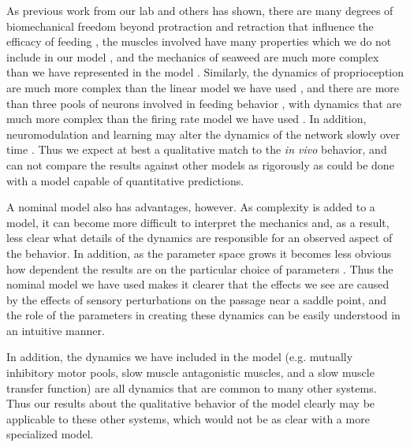 As
previous work from our lab and others has shown, there are many degrees of
biomechanical freedom beyond protraction and retraction that influence the
efficacy of feeding
\citep{sutton_passive_2004,sutton_neural_2004,novakovic_mechanical_2006}, the
muscles involved have
many properties which we do not include in our model
\citep{yu_biomechanical_1999,zajac_muscle_1989},
and the mechanics of seaweed are much more complex than we have represented in
the model \citep{denny_mechanics_2002,harder_comparison_2006}.  Similarly,
the dynamics of proprioception are much more complex than the linear model
we have used \citep{evans_proprioceptive_1998}, and there are more than three
pools of neurons involved in feeding behavior
\citep{hurwitz_different_1997}, with dynamics that are much more complex than
the firing rate model we have used \citep{susswein_mechanisms_2002}.
In addition, neuromodulation and learning may alter the dynamics of the network slowly over time \citep{nargeot_functional_2012,susswein_nitric_2012}.
Thus we
expect at best a qualitative match to the \textit{in vivo} behavior, and can
not compare the results against other models as rigorously as could be done
with a model capable of quantitative predictions.

A nominal model also has advantages, however.  As complexity is added to a
model, it can become more difficult to interpret the mechanics and, as a
result, less clear what details of the dynamics are responsible for an observed
aspect of the behavior.  In addition, as the parameter space grows it becomes less
obvious how dependent the results are on the particular choice of parameters
\citep{foster_significance_1993}.  Thus the nominal model we have used makes it clearer that
the effects we see are caused by the effects of sensory perturbations on the
passage near a saddle point, and the role of the parameters in creating these
dynamics can be easily understood in an intuitive manner.

In addition, the dynamics we have included in the model (e.g.  mutually
inhibitory motor pools, slow muscle antagonistic muscles, and a slow muscle
transfer function) are all dynamics that are common to many other systems.
Thus our results about the qualitative behavior of the model clearly may be
applicable to these other systems, which would not be as clear with a more
specialized model.

